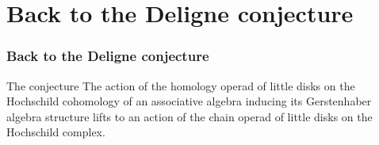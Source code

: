 \documentclass{beamer}
\theoremstyle{definition}
\newcommand{\CC}{\mathcal{C}}
\begin{document}
%	
%



\section{Back to the Deligne conjecture}

\begin{frame}
	\frametitle{Back to the Deligne conjecture}
	\begin{block}{The conjecture}
		The action of the homology operad of little disks on the Hochschild cohomology of an associative algebra inducing its Gerstenhaber algebra structure lifts to an action of the chain operad of little disks on the Hochschild complex.
	\end{block}
	\end{frame}
\end{document}
